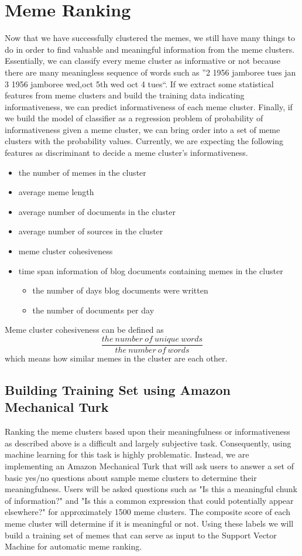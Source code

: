 \documentclass{sig-alternate}
\begin{document}
\section{Meme Ranking}
Now that we have successfully clustered the memes, we still have many things to do in order to find valuable and meaningful information from the meme clusters. Essentially, we can classify every meme cluster as informative or not because there are many meaningless sequence of words such as ''2 1956 jamboree tues jan 3 1956 jamboree wed,oct 5th wed oct 4 tues``. If we extract some statistical features from meme clusters and build the training data indicating informativeness, we can predict informativeness of each meme cluster. Finally, if we build the model of classifier as a regression problem of probability of informativeness given a meme cluster, we can bring order into a set of meme clusters with the probability values. Currently, we are expecting the following features as discriminant to decide a meme cluster's informativeness.
\begin{itemize}
 \item the number of memes in the cluster
 \item average meme length
 \item average number of documents in the cluster
 \item average number of sources in the cluster
 \item meme cluster cohesiveness
 \item time span information of blog documents containing memes in the cluster
  \begin{itemize}
    \item the number of days blog documents were written
    \item the number of documents per day
  \end{itemize}
\end{itemize}
Meme cluster cohesiveness can be defined as 
\begin{displaymath}
\frac{the\ number\ of\ unique\ words}{the\ number\ of\ words}
\end{displaymath}
which means how similar memes in the cluster are each other.

\subsection{Building Training Set using Amazon Mechanical Turk}

Ranking the meme clusters based upon their meaningfulness or informativeness as described above is a difficult and largely subjective task.  Consequently, using machine learning for this task is highly problematic.  Instead, we are implementing an Amazon Mechanical Turk that will ask users to answer a set of basic yes/no questions about sample meme clusters to determine their meaningfulness.
  Users will be asked questions such as "Is this a meaningful chunk of information?" and "Is this a common expression that could potentially appear elsewhere?" for approximately 1500 meme clusters.  The composite score of each meme cluster will determine if it is meaningful or not.  Using these labels we will build a training set of memes that can serve as input to the Support Vector Machine for automatic meme ranking.
\end{document}
